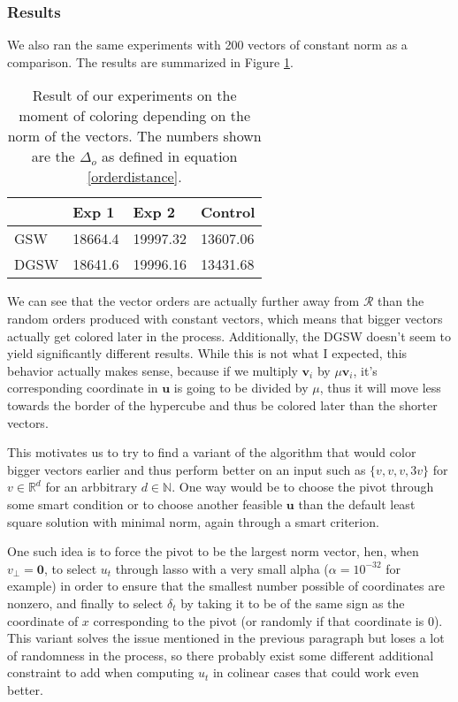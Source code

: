 \documentclass[12pt]{article}
\begin{document}
\subsubsection{Results}
We also ran the same experiments with 200 vectors of constant norm as a comparison. The results are summarized in Figure \ref{norm_when_colored}.
\begin{center}
\begin{table}[h]
\begin{tabular}{l|lll}
     & Exp 1   & Exp 2    & Control  \\
\hline
GSW  & 18664.4 & 19997.32 & 13607.06 \\
DGSW & 18641.6 & 19996.16 & 13431.68
\end{tabular}
\caption{Result of our experiments on the moment of coloring depending on the norm of the vectors. The numbers shown are the $\Delta_o$ as defined in equation \ref{orderdistance}.}
\label{norm_when_colored}
\end{table}
\end{center}

We can see that the vector orders are actually further away from $\mathcal{R}$ than the random orders produced with constant vectors, which means that bigger vectors actually get colored later in the process. Additionally, the DGSW doesn't seem to yield significantly different results. While this is not what I expected, this behavior actually makes sense, because if we multiply $\textbf{v}_i$ by $\mu\textbf{v}_i$, it's corresponding coordinate in $\textbf{u}$ is going to be divided by $\mu$, thus it will move less towards the border of the hypercube and thus be colored later than the shorter vectors.

This motivates us to try to find a variant of the algorithm that would color bigger vectors earlier and thus perform better on an input such as $\{v,v,v,3v\}$ for $v\in\mathbb{R}^d$ for an arbbitrary $d\in\mathbb{N}$. One way would be to choose the pivot through some smart condition or to choose another feasible $\textbf{u}$ than the default least square solution with minimal norm, again through a smart criterion.

One such idea is to force the pivot to be the largest norm vector, hen, when $v_\perp=\textbf{0}$, to select $u_t$ through lasso with a very small alpha ($\alpha=10^{-32}$ for example) in order to ensure that the smallest number possible of coordinates are nonzero, and finally to select $\delta_t$ by taking it to be of the same sign as the coordinate of $x$ corresponding to the pivot (or randomly if that coordinate is 0). This variant solves the issue mentioned in the previous paragraph but loses a lot of randomness in the process, so there probably exist some different additional constraint to add when computing $u_t$ in colinear cases that could work even better.
\end{document}
